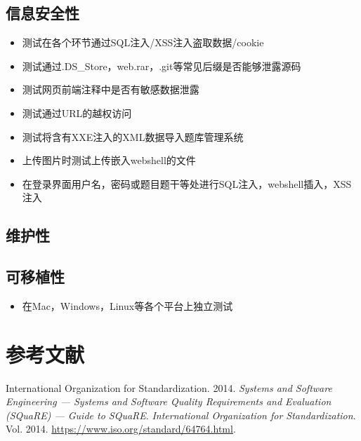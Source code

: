 \documentclass[hyperref, a4paper]{ctexart}
\providecommand{\tightlist}{%
  \setlength{\itemsep}{0pt}\setlength{\parskip}{0pt}}
\begin{document}
\hypertarget{ux4fe1ux606fux5b89ux5168ux6027}{%
\subsection{信息安全性}\label{ux4fe1ux606fux5b89ux5168ux6027}}

\begin{itemize}
\tightlist
\item
  测试在各个环节通过SQL注入/XSS注入盗取数据/cookie
\item
  测试通过.DS\_Store，web.rar，.git等常见后缀是否能够泄露源码
\item
  测试网页前端注释中是否有敏感数据泄露
\item
  测试通过URL的越权访问
\item
  测试将含有XXE注入的XML数据导入题库管理系统
\item
  上传图片时测试上传嵌入webshell的文件
\item
  在登录界面用户名，密码或题目题干等处进行SQL注入，webshell插入，XSS注入
\end{itemize}

\hypertarget{ux7ef4ux62a4ux6027}{%
\subsection{维护性}\label{ux7ef4ux62a4ux6027}}

\hypertarget{ux53efux79fbux690dux6027}{%
\subsection{可移植性}\label{ux53efux79fbux690dux6027}}

\begin{itemize}
\tightlist
\item
  在Mac，Windows，Linux等各个平台上独立测试
\end{itemize}

\pagebreak

\hypertarget{ux53c2ux8003ux6587ux732e}{%
\section*{参考文献}\label{ux53c2ux8003ux6587ux732e}}

\hypertarget{refs}{}
\leavevmode\hypertarget{ref-innovativeInternationalisation}{}%
International Organization for Standardization. 2014. \emph{Systems and
Software Engineering --- Systems and Software Quality Requirements and
Evaluation (SQuaRE) --- Guide to SQuaRE}. \emph{International
Organization for Standardization}. Vol. 2014.
\url{https://www.iso.org/standard/64764.html}.
\end{document}
